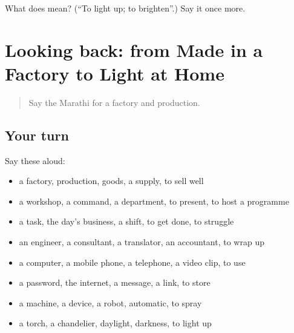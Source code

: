\begin{tcolorbox}[breakable,colback=teal!4,colframe=teal!35!black,title={Before you move on}]
What does  mean? (\textquotedblleft{}To light up; to brighten\textquotedblright{}.) Say it once more.
\end{tcolorbox}
\section[(dialogue)]{Looking back: from Made in a Factory to Light at Home}

\label{lesson:MR-R519-review-512-519}



\begin{quote}
Say the Marathi for a factory and production.
\end{quote}

\subsection*{Your turn}
Say these aloud:

\begin{itemize}
\raggedright
  \item a factory, production, goods, a supply, to sell well
  \item a workshop, a command, a department, to present, to host a programme
  \item a task, the day's business, a shift, to get done, to struggle
  \item an engineer, a consultant, a translator, an accountant, to wrap up
  \item a computer, a mobile phone, a telephone, a video clip, to use
  \item a password, the internet, a message, a link, to store
  \item a machine, a device, a robot, automatic, to spray
  \item a torch, a chandelier, daylight, darkness, to light up
\end{itemize}

